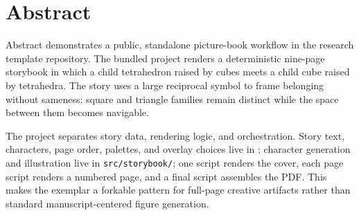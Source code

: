 \documentclass[
  ignorenonframetext,
]{beamer}
\author{\texorpdfstring{}{}}
\date{}
\begin{document}
\section{Abstract}\label{abstract}

\begin{frame}{Abstract}
 demonstrates a public, standalone
picture-book workflow in the research template repository. The bundled
project renders a deterministic nine-page storybook in which a child
tetrahedron raised by cubes meets a child cube raised by tetrahedra. The
story uses a large reciprocal symbol to frame belonging without
sameness: square and triangle families remain distinct while the space
between them becomes navigable.

The project separates story data, rendering logic, and orchestration.
Story text, characters, page order, palettes, and overlay choices live
in ; character generation and illustration
live in \texttt{src/storybook/}; one script renders the cover, each page
script renders a numbered page, and a final script assembles the PDF.
This makes the exemplar a forkable pattern for full-page creative
artifacts rather than standard manuscript-centered figure generation.
\end{frame}
\end{document}
